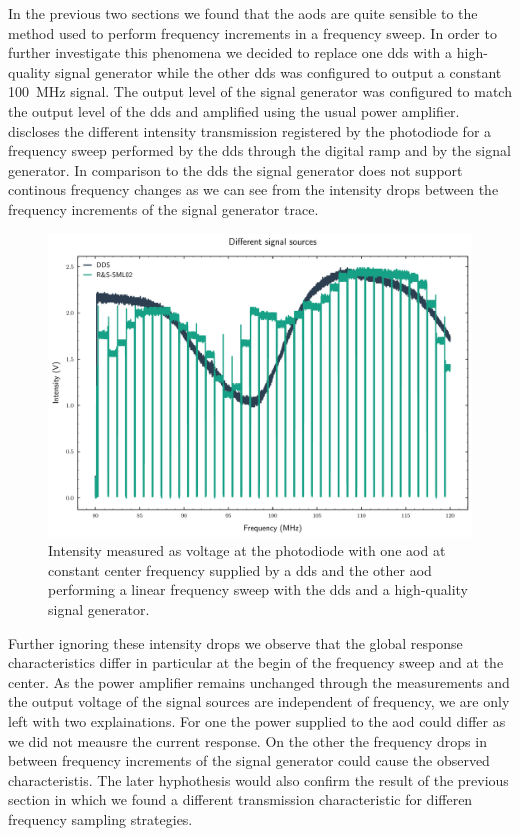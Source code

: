 In the previous two sections we found that the \gls{aod}s are quite sensible
to the method used to perform frequency increments in a frequency sweep. In
order to further investigate this phenomena we decided to replace one
\gls{dds} with a high-quality signal generator while the other \gls{dds} was
configured to output a constant \SI{100}{\mega\hertz} signal. The output
level of the signal generator was configured to match the output level of
the \gls{dds} and amplified using the usual power amplifier.
 discloses the different
intensity transmission registered by the photodiode for a frequency sweep
performed by the \gls{dds} through the digital ramp and by the signal
generator. In comparison to the \gls{dds} the signal generator does not
support continous frequency changes as we can see from the intensity drops
between the frequency increments of the signal generator trace.
\begin{figure}[htb]
  \centering
  \includegraphics[width=.9\textwidth]{../figure/intensity/distribution/signal-sources.pdf}
  \caption{Intensity measured as voltage at the photodiode with one \gls{aod}
    at constant center frequency supplied by a \gls{dds} and the other
    \gls{aod} performing a linear frequency sweep with the \gls{dds} and a
    high-quality signal generator.
  }\label{fig:intensity_distribution_signal_sources}
\end{figure}
Further ignoring these intensity drops we observe that the global response
characteristics differ in particular at the begin of the frequency sweep and
at the center. As the power amplifier remains unchanged through the
measurements and the output voltage of the signal sources are independent of
frequency, we are only left with two explainations. For one the power supplied
to the \gls{aod} could differ as we did not meausre the current response. On
the other the frequency drops in between frequency increments of the signal
generator could cause the observed characteristis. The later hyphothesis would
also confirm the result of the previous section in which we found a different
transmission characteristic for differen frequency sampling strategies.


